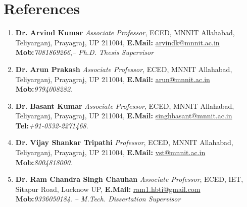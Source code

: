 \vspace{-2.5em}
\section{References}
\vspace{-1em}
\begin{enumerate}[label={\textbf{\arabic*}.\ }]
\item \textbf{Dr. Arvind Kumar} \emph{Associate Professor}, ECED, MNNIT Allahabad, Teliyarganj, Prayagraj, UP 211004, \textbf{E.Mail: }\href{mailto:arvindk@mnnit.ac.in}{arvindk@mnnit.ac.in} \textbf{Mob:}\emph{7081869266},\hfill \emph{-- Ph.D. Thesis Supervisor}
\item \textbf{Dr. Arun Prakash} \emph{Associate Professor}, ECED, MNNIT Allahabad, Teliyarganj, Prayagraj, UP 211004, \textbf{E.Mail: }\href{mailto:arun@mnnit.ac.in}{arun@mnnit.ac.in} \textbf{Mob:}\emph{9794008282}.
\item \textbf{Dr. Basant Kumar} \emph{Associate Professor}, ECED, MNNIT Allahabad, Teliyarganj, Prayagraj, UP 211004, \textbf{E.Mail: }\href{mailto:singhbasant@mnnit.ac.in}{singhbasant@mnnit.ac.in} \textbf{Tel:}\emph{+91-0532-2271468}.
\item \textbf{Dr. Vijay Shankar Tripathi} \emph{Professor}, ECED, MNNIT Allahabad, Teliyarganj, Prayagraj, UP 211004, \textbf{E.Mail: }\href{mailto:vst@mnnit.ac.in}{vst@mnnit.ac.in} \textbf{Mob:}\emph{8004818000}.
\item \textbf{Dr. Ram Chandra Singh Chauhan} \emph{Associate Professor}, ECED, IET, Sitapur Road, Lucknow UP, \textbf{E.Mail: }\href{mailto:ram1.hbti@gmail.com}{ram1.hbti@gmail.com} \textbf{Mob:}\emph{9336050184}. \hfill\emph{-- M.Tech. Dissertation Supervisor}
\end{enumerate}
\vspace{-2em}
\sectionline
